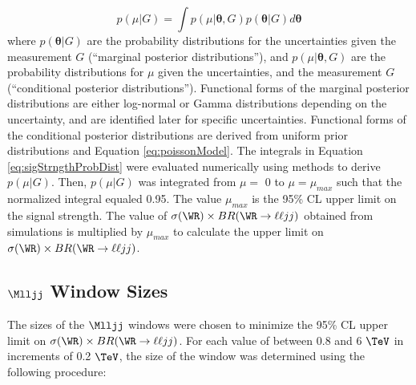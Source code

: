 \begin{equation}
	p(\mu|G) = \int p(\mu|\pmb{\theta},G)p(\pmb{\theta}|G)d\pmb{\theta}
	\label{eq:sigStrngthProbDist}
\end{equation}
where $p(\pmb{\theta}|G)$ are the probability distributions for the uncertainties given the measurement $G$ (``marginal 
posterior distributions''), and $p(\mu|\pmb{\theta},G)$ are the probability distributions for $\mu$ given the uncertainties, 
and the measurement $G$ (``conditional posterior distributions'').  Functional forms of the marginal posterior distributions 
are either log-normal or Gamma distributions depending on the uncertainty, and are identified later for specific uncertainties.  
Functional forms of the conditional posterior distributions are derived from uniform prior distributions and Equation 
\ref{eq:poissonModel}.  The integrals in Equation \ref{eq:sigStrngthProbDist} were evaluated numerically using \MC methods 
to derive $p(\mu|G)$.  Then, $p(\mu|G)$ was integrated from $\mu =$ 0 to $\mu = \mu_{max}$ such that the normalized integral 
equaled 0.95.  The value $\mu_{max}$ is the 95\% CL upper limit on the signal strength.  The value of $\sigma(\WR) \times 
BR(\WR \rightarrow \ell\ell jj)$ obtained from simulations is multiplied by $\mu_{max}$ to calculate the upper limit on 
$\sigma(\WR) \times BR(\WR \rightarrow \ell\ell jj)$.

\subsection{$\Mlljj$ Window Sizes}
\label{sec:mlljjWindows}
The sizes of the $\Mlljj$ windows were chosen to minimize the 95\% CL upper limit on $\sigma(\WR) \times BR(\WR \rightarrow \ell\ell jj)$.  
For each value of \mWR between 0.8 and 6 $\TeV$ in increments of 0.2 $\TeV$, the size of the window was determined using the 
following procedure:

